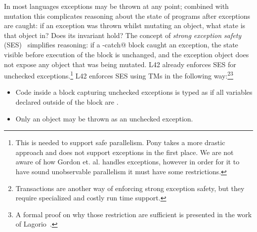{}
In most languages exceptions may be thrown at any point; combined with mutation this complicates reasoning about the state of programs after exceptions are caught: if an exception was thrown whilst mutating an object, what state is that object in? Does its invariant hold?
The concept of \emph{strong exception safety} (SES)~\cite{Abrahams2000,JOT:issue_2011_01/article1} simplifies reasoning:
if a \Q@try-catch@ block caught an exception, the state visible before execution of the \Q@try@ block is unchanged, and the exception object does not expose any object that was being mutated.
L42 already enforces SES for unchecked exceptions.\footnote{
This is needed to support safe parallelism. Pony takes a more drastic approach and does not support exceptions in the first place. 
We are not aware of how Gordon et. al. handles exceptions, however in order for it to have sound unobservable parallelism it must have some restrictions.
}
L42 enforces SES using TMs in the following way:\footnote{Transactions are another way of enforcing strong exception safety, but they require specialized and costly run time support.}\footnote{A formal proof on why those restriction are sufficient is presented in the work of Lagorio~\cite{JOT:issue_2011_01/article1}.}
\begin{itemize}
\item Code inside a \Q@try@ block capturing unchecked exceptions is typed as if all \Q@mut@ variables declared outside of the block are \Q@read@.
\item Only an \Q@imm@ object may be thrown as an unchecked exception.
\end{itemize} 

